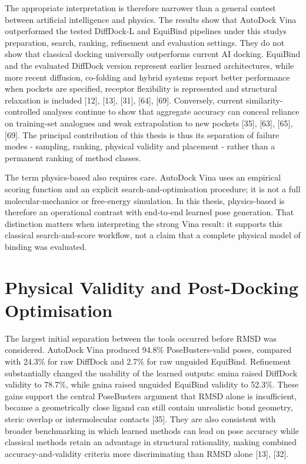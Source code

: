 The appropriate interpretation is therefore narrower than a general contest between artificial intelligence and physics. The results show that AutoDock Vina outperformed the tested DiffDock-L and EquiBind pipelines under this study\textquotesingle s preparation, search, ranking, refinement and evaluation settings. They do not show that classical docking universally outperforms current AI docking. EquiBind and the evaluated DiffDock version represent earlier learned architectures, while more recent diffusion, co-folding and hybrid systems report better performance when pockets are specified, receptor flexibility is represented and structural relaxation is included {[}12{]}, {[}13{]}, {[}31{]}, {[}64{]}, {[}69{]}. Conversely, current similarity-controlled analyses continue to show that aggregate accuracy can conceal reliance on training-set analogues and weak extrapolation to new pockets {[}35{]}, {[}63{]}, {[}65{]}, {[}69{]}. The principal contribution of this thesis is thus its separation of failure modes - sampling, ranking, physical validity and placement - rather than a permanent ranking of method classes.

The term physics-based also requires care. AutoDock Vina uses an empirical scoring function and an explicit search-and-optimisation procedure; it is not a full molecular-mechanics or free-energy simulation. In this thesis, physics-based is therefore an operational contrast with end-to-end learned pose generation. That distinction matters when interpreting the strong Vina result: it supports this classical search-and-score workflow, not a claim that a complete physical model of binding was evaluated.

\hypertarget{physical-validity-and-post-docking-optimisation}{%
\section{Physical Validity and Post-Docking Optimisation}\label{physical-validity-and-post-docking-optimisation}}

The largest initial separation between the tools occurred before RMSD was considered. AutoDock Vina produced 94.8\% PoseBusters-valid poses, compared with 24.3\% for raw DiffDock and 2.7\% for raw unguided EquiBind. Refinement substantially changed the usability of the learned outputs: smina raised DiffDock validity to 78.7\%, while gnina raised unguided EquiBind validity to 52.3\%. These gains support the central PoseBusters argument that RMSD alone is insufficient, because a geometrically close ligand can still contain unrealistic bond geometry, steric overlap or intermolecular contacts {[}35{]}. They are also consistent with broader benchmarking in which learned methods can lead on pose accuracy while classical methods retain an advantage in structural rationality, making combined accuracy-and-validity criteria more discriminating than RMSD alone {[}13{]}, {[}32{]}.

